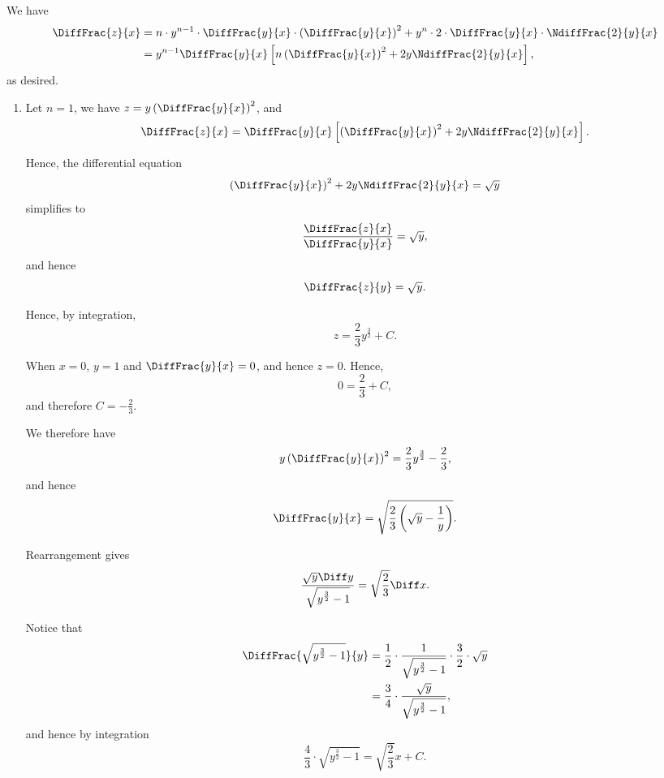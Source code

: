 \Question{\currfilebase}

We have
\begin{align*}
    \DiffFrac{z}{x} & = n \cdot y^{n - 1} \cdot \DiffFrac{y}{x} \cdot \left(\DiffFrac{y}{x}\right)^2 + y^n \cdot 2 \cdot \DiffFrac{y}{x} \cdot \NdiffFrac{2}{y}{x} \\
                    & = y^{n - 1} \DiffFrac{y}{x} \left[n \left(\DiffFrac{y}{x}\right)^2 + 2y \NdiffFrac{2}{y}{x}\right],
\end{align*}
as desired.

\begin{enumerate}
    \item Let \(n = 1\), we have \(z = y \left(\DiffFrac{y}{x}\right)^2\), and
          \[
              \DiffFrac{z}{x} = \DiffFrac{y}{x} \left[\left(\DiffFrac{y}{x}\right)^2 + 2y \NdiffFrac{2}{y}{x}\right].
          \]

          Hence, the differential equation
          \[
              \left(\DiffFrac{y}{x}\right)^2 + 2y \NdiffFrac{2}{y}{x} = \sqrt{y}
          \]
          simplifies to
          \[
              \frac{\DiffFrac{z}{x}}{\DiffFrac{y}{x}} = \sqrt{y},
          \]
          and hence
          \[
              \DiffFrac{z}{y} = \sqrt{y}.
          \]

          Hence, by integration,
          \[
              z = \frac{2}{3} y^{\frac{3}{2}} + C.
          \]

          When \(x = 0\), \(y = 1\) and \(\DiffFrac{y}{x} = 0\), and hence \(z = 0\). Hence,
          \[
              0 = \frac{2}{3} + C,
          \]
          and therefore \(C = -\frac{2}{3}\).

          We therefore have
          \[
              y \left(\DiffFrac{y}{x}\right)^2 =\frac{2}{3} y^{\frac{3}{2}} - \frac{2}{3},
          \]
          and hence
          \[
              \DiffFrac{y}{x} = \sqrt{\frac{2}{3} \left(\sqrt{y} - \frac{1}{y}\right)}.
          \]

          Rearrangement gives
          \[
              \frac{\sqrt{y} \Diff y}{\sqrt{y^{\frac{3}{2}} - 1}} = \sqrt{\frac{2}{3}} \Diff x.
          \]

          Notice that
          \begin{align*}
              \DiffFrac{\sqrt{y^{\frac{3}{2}} - 1}}{y} & = \frac{1}{2} \cdot \frac{1}{\sqrt{y^{\frac{3}{2}} - 1}} \cdot \frac{3}{2} \cdot \sqrt{y} \\
                                                       & = \frac{3}{4} \cdot \frac{\sqrt{y}}{\sqrt{y^{\frac{3}{2}} - 1}},
          \end{align*}
          and hence by integration
          \[
              \frac{4}{3} \cdot \sqrt{y^{\frac{3}{2}} - 1} = \sqrt{\frac{2}{3}} x + C.
          \]


\end{enumerate}
